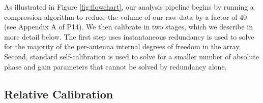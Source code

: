 \documentclass[twocolumn,numberedappendix]{emulateapj} \shorttitle{PSA64}
\begin{document}
As illustrated in Figure \ref{fig:flowchart},
our analysis pipeline begins by running a compression
algorithm to reduce the volume of our raw data by a factor of 40
(see Appendix A of P14). 
We then calibrate in two stages, which we describe in more detail below.  
The first step uses instantaneous redundancy is used to solve for the majority of the 
per-antenna internal degrees of freedom in the array.  Second, standard self-calibration is used 
to solve for a smaller number of
absolute phase and gain parameters that cannot be solved by redundancy alone. 

\subsection{Relative Calibration}
%         
%
\end{document}
